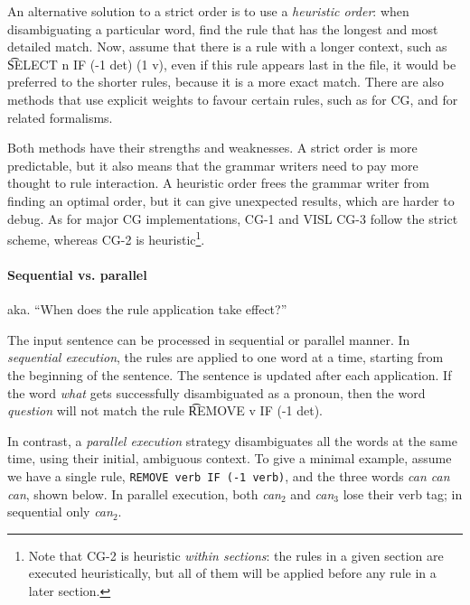 An alternative solution to a strict order is to use a \emph{heuristic
  order}: when disambiguating a particular word, find the rule that
has the longest and most detailed match. Now, assume that there is a
rule with a longer context, such as \t{SELECT n IF (-1 det) (1 v)},
even if this rule appears last in the file, it would be preferred to
the shorter rules, because it is a more exact match.  There are also
methods that use explicit weights to favour certain rules, such as
\citet{pirinen2015} for CG, and
\citet{voutilainen1994designing,oflazer97votingconstraints,silfverberg2009conflict}
for related formalisms.
					
Both methods have their strengths and weaknesses. A strict order is
more predictable, but it also means that the grammar writers need to
pay more thought to rule interaction. A heuristic order frees the
grammar writer from finding an optimal order, but it can give
unexpected results, which are harder to debug.  As for major CG
implementations, CG-1 \cite{karlsson1990cgp} and VISL CG-3
\cite{vislcg3} follow the strict scheme, whereas CG-2
\cite{tapanainen1996} is heuristic\footnote{Note that CG-2 is
  heuristic \emph{within sections}: the rules in a given section are
  executed heuristically, but all of them will be applied before any
  rule in a later section.}.





\paragraph{Sequential vs. parallel}

aka. ``When does the rule application take effect?''

The input sentence can be processed in sequential or parallel manner.
In \emph{sequential execution}, the rules are applied to one word at a
time, starting from the beginning of the sentence. The sentence is
updated after each application. If the word \emph{what} gets
successfully disambiguated as a pronoun, then the word \emph{question}
will not match the rule \t{REMOVE v IF (-1 det)}.


In contrast, a \emph{parallel execution} strategy disambiguates all
the words at the same time, using their initial, ambiguous context.
To give a minimal example, assume we have a single rule,
\texttt{REMOVE verb IF (-1 verb)}, and the three words \emph{can can
  can}, shown below.  In parallel execution, both \emph{can$_2$} and
\emph{can$_3$} lose their verb tag; in sequential only \emph{can$_2$}.

